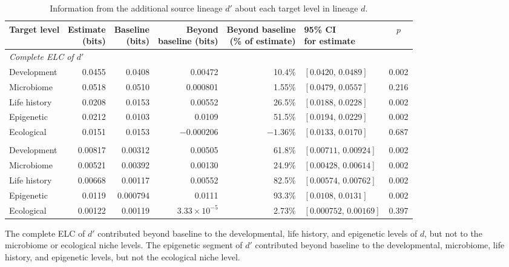 \documentclass[11pt]{article}
\begin{document}
\begin{table}[H]
\centering
\small
\setlength{\tabcolsep}{4pt}
\caption{Information from the additional source lineage $d'$ about each target level in lineage $d$.}
\label{tab:additional-source-target-levels}
\begin{tabular}{lrrrrlc}
\toprule
Target level
& \shortstack{Estimate\\(bits)}
& \shortstack{Baseline\\(bits)}
& \shortstack{Beyond\\baseline (bits)}
& \shortstack{Beyond baseline\\(\% of estimate)}
& \shortstack{95\% CI\\for estimate}
& $p$\\
\midrule
\multicolumn{7}{l}{\textit{Complete ELC of $d'$}}\\
Development
& 0.0455 & 0.0408 & 0.00472 & 10.4\%
& $[0.0420,\,0.0489]$ & 0.002\\
Microbiome
& 0.0518 & 0.0510 & 0.000801 & 1.55\%
& $[0.0479,\,0.0557]$ & 0.216\\
Life history
& 0.0208 & 0.0153 & 0.00552 & 26.5\%
& $[0.0188,\,0.0228]$ & 0.002\\
Epigenetic
& 0.0212 & 0.0103 & 0.0109 & 51.5\%
& $[0.0194,\,0.0229]$ & 0.002\\
Ecological
& 0.0151 & 0.0153 & $-0.000206$ & $-1.36\%$
& $[0.0133,\,0.0170]$ & 0.687\\
\addlinespace
\multicolumn{7}{l}{\textit{Epigenetic segment of $d'$}}\\
Development
& 0.00817 & 0.00312 & 0.00505 & 61.8\%
& $[0.00711,\,0.00924]$ & 0.002\\
Microbiome
& 0.00521 & 0.00392 & 0.00130 & 24.9\%
& $[0.00428,\,0.00614]$ & 0.002\\
Life history
& 0.00668 & 0.00117 & 0.00552 & 82.5\%
& $[0.00574,\,0.00762]$ & 0.002\\
Epigenetic
& 0.0119 & 0.000794 & 0.0111 & 93.3\%
& $[0.0108,\,0.0131]$ & 0.002\\
Ecological
& 0.00122 & 0.00119 & $3.33\times10^{-5}$ & 2.73\%
& $[0.000752,\,0.00169]$ & 0.397\\
\bottomrule
\end{tabular}
\end{table}
The complete ELC of $d'$ contributed beyond baseline to the developmental, life history, and epigenetic levels of $d$, but not to the microbiome or ecological niche levels. The epigenetic segment of $d'$ contributed beyond baseline to the developmental, microbiome, life history, and epigenetic levels, but not the ecological niche level.
\end{document}
